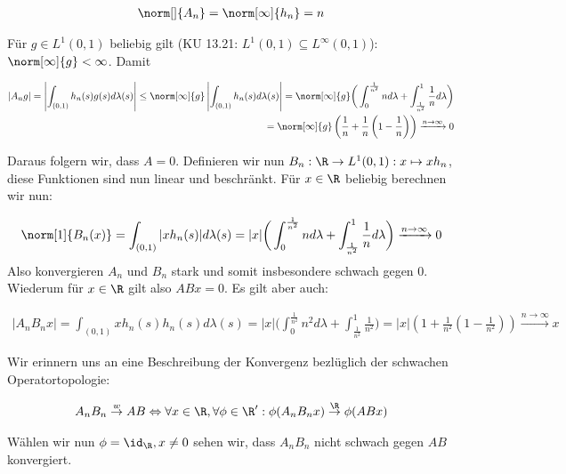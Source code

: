 \begin{solution}
\begin{align*}
  \norm[]{A_n} = \norm[\infty]{h_n} = n
\end{align*}

Für $g \in L^1(0,1)$ beliebig gilt (KU 13.21: $L^1(0,1) \subseteq L^{\infty}(0,1)$):
$\norm[\infty]{g} < \infty$. Damit

\begin{align*}
  |A_n g| =
  \left| \int_{(0,1)}h_n(s) g(s)d\lambda(s) \right|
  \leq \norm[\infty]{g} \left|\int_{(0,1)} h_n(s) d\lambda(s)\right|
  =\norm[\infty]{g}
  \bigg( \int_0^\frac{1}{n^2} n d\lambda + \int_\frac{1}{n^2}^1 \frac{1}{n} d\lambda
  \bigg) \\
  = \norm[\infty]{g} \left(\frac{1}{n}+\frac{1}{n}\left(1-\frac{1}{n}\right)\right)
  \xrightarrow{n \rightarrow \infty} 0
\end{align*}

Daraus folgern wir, dass $A=0$. Definieren wir nun
$B_n: \R \rightarrow L^1(0,1): x \mapsto xh_n$, diese Funktionen sind nun linear und
beschränkt. Für $x \in \R$ beliebig berechnen wir nun:

\begin{align*}
  \norm[1]{B_n(x)} = \int_{(0,1)} |xh_n(s)|d\lambda(s) = |x|
  \bigg( \int_0^\frac{1}{n^2} n d\lambda + \int_\frac{1}{n^2}^1 \frac{1}{n} d\lambda
  \bigg)
  \xrightarrow{n \rightarrow \infty} 0
\end{align*}
Also konvergieren $A_n$ und $B_n$ stark und somit insbesondere schwach gegen 0. Wiederum für $x \in \R$ gilt also
$ABx = 0$. Es gilt aber auch:

\begin{align*}
  |A_n B_n x| =
  \int_{(0,1)} x h_n(s) h_n(s) d\lambda(s) = |x|
  \bigg(\int_0^\frac{1}{n^2} n^2 d\lambda + \int_\frac{1}{n^2}^1 \frac{1}{n^2}
  \bigg)
  = |x|\left(1+\frac{1}{n^2}\left(1-\frac{1}{n^2}\right)\right)
  \xrightarrow{n \rightarrow \infty} x
\end{align*}

Wir erinnern uns an eine Beschreibung der Konvergenz bezlüglich der schwachen Operatortopologie:

\begin{align*}
  A_n B_n \stackrel{w}{\rightarrow} AB \Leftrightarrow
  \forall x \in \R, \forall \phi \in \R':
  \phi(A_n B_n x) \stackrel{\R}{\rightarrow} \phi(ABx)
\end{align*}

Wählen wir nun $\phi=\id_\R, x \neq 0$ sehen wir, dass $A_n B_n$ nicht schwach gegen $AB$ konvergiert.
\end{solution}
